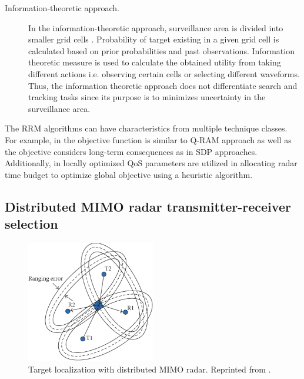 \documentclass[english, 12pt, a4paper, elec, utf8, a-1b, online]{aaltothesis}
\begin{document}
\begin{description}
\item[Information-theoretic approach.]

In the information-theoretic approach, surveillance area is divided into smaller grid cells \cite{Kastella1997, Kreucher2004, Kreucher2005, Xu2010}.
Probability of target existing in a given grid cell is calculated based on prior probabilities and past observations.
Information theoretic measure is used to calculate the obtained utility from taking different actions i.e. observing certain cells or selecting different waveforms.
Thus, the information theoretic approach does not differentiate search and tracking tasks since its purpose is to minimizes uncertainty in the surveillance area.

\end{description}


\noindent
The RRM algorithms can have characteristics from multiple technique classes. 
For example, in \cite{Byrne2015, Byrne2016} the objective function is similar to Q-RAM approach as well as the objective considers long-term consequences as in SDP approaches.
Additionally, in \cite{Esfahani2012} locally optimized QoS parameters are utilized in allocating radar time budget to optimize global objective using a heuristic algorithm.

\subsection{Distributed MIMO radar transmitter-receiver selection}\label{sec:TX_RX_selection_review}

\begin{figure}[b]
    \centering
    \includegraphics[width=0.5\textwidth]{figures/background/MIMO_TX_RX_selection.png}
    \caption{Target localization with distributed MIMO radar. Reprinted from \cite{Sun2014}.}
    \label{fig:dist_MIMO_localization}
\end{figure}
\end{document}
